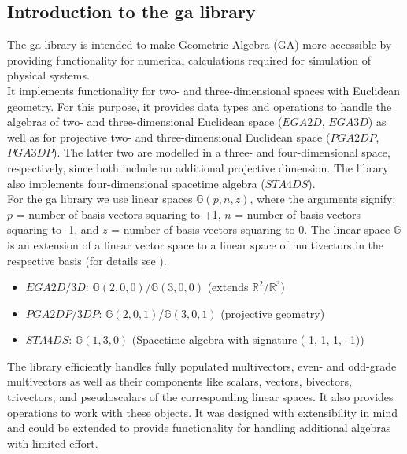 \subsection{Introduction to the ga library}
\label{subsection:intro}

The ga library is intended to make Geometric Algebra (GA) more accessible by providing
functionality for numerical calculations required for simulation of physical systems. \\

It implements functionality for two- and three-dimensional spaces with Euclidean geometry.
For this purpose, it provides data types and operations to handle the algebras of two- and
three-dimensional Euclidean space ($EGA2D$, $EGA3D$) as well as for projective two- and
three-dimensional Euclidean space ($PGA2DP$, $PGA3DP$). The latter two are modelled in a
three- and four-dimensional space, respectively, since both include an additional
projective dimension. The library also implements four-dimensional spacetime algebra
($STA4DS$). \\

For the ga library we use linear spaces $\mathbb{G}(p,n,z)$, where the arguments signify:
$p$ = number of basis vectors squaring to +1, $n$ = number of basis vectors squaring to
-1, and $z$ = number of basis vectors squaring to 0. The linear space $\mathbb{G}$ is an
extension of a linear vector space to a linear space of multivectors in the respective
basis (for details see \cite{Macdonald:2010}).
\begin{itemize}
\item $EGA2D/3D$: $\mathbb{G}(2,0,0)$/$\mathbb{G}(3,0,0)$ (extends
                  $\mathbb{R}^2$/$\mathbb{R}^3$)
\item $PGA2DP/3DP$: $\mathbb{G}(2,0,1)$/$\mathbb{G}(3,0,1)$ (projective geometry)
\item $STA4DS$: $\mathbb{G}(1,3,0)$ (Spacetime algebra with signature (-1,-1,-1,+1))
\end{itemize}

The library efficiently handles fully populated multivectors, even- and odd-grade
multivectors as well as their components like scalars, vectors, bivectors, trivectors, and
pseudoscalars of the corresponding linear spaces. It also provides operations to work with
these objects. It was designed with extensibility in mind and could be extended to provide
functionality for handling additional algebras with limited effort. \\

